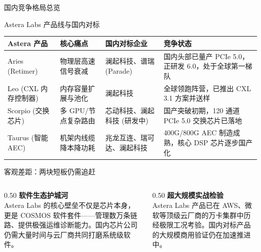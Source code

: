 \documentclass[aspectratio=169, 8pt, UTF8]{ctexbeamer}
\begin{document}
\begin{frame}{国内竞争格局总览}
  \begin{block}{Astera Labs 产品线与国内对标}
    \vspace{2pt}
    \centering
    \footnotesize
    \begin{tabularx}{\textwidth}{p{2.2cm} p{2.4cm} p{3.5cm} p{4.5cm}}
      \toprule
      \textbf{Astera 产品} & \textbf{核心痛点} & \textbf{国内对标企业} & \textbf{竞争状态} \\
      \midrule
      Aries (Retimer)
        & 物理层高速信号衰减
        & 澜起科技、谱瑞 (Parade)
        & 国内头部已量产 PCIe 5.0，正研发 6.0，处于全球第一梯队 \\
      \addlinespace
      Leo (CXL 内存控制器)
        & 内存容量扩展与池化
        & 澜起科技
        & 全球领跑阵营，已推出 CXL 3.1 方案并送样 \\
      \addlinespace
      Scorpio (交换芯片)
        & 多 GPU/节点复杂路由
        & 芯动科技、澜起科技 (研发中)
        & 国产突破初期，120 通道 PCIe 5.0 交换芯片已落地 \\
      \addlinespace
      Taurus (智能 AEC)
        & 机架内线缆降本降功耗
        & 兆龙互连、瑞可达、澜起科技
        & 400G/800G AEC 制造成熟，核心 DSP 芯片逐步国产化 \\
      \bottomrule
    \end{tabularx}
  \end{block}

  \vspace{4pt}

  \begin{alertblock}{客观差距：两块短板仍需追赶}
    \begin{columns}[T]
      \begin{column}{0.50\textwidth}
        \textbf{软件生态护城河}\\[2pt]
        Astera Labs 的核心壁垒不仅是芯片本身，更是 COSMOS 软件套件——管理数万条链路、提供极强运维诊断能力。国内芯片公司仍需大量时间与云厂商共同打磨系统级软件。
      \end{column}
      \begin{column}{0.50\textwidth}
        \textbf{超大规模实战检验}\\[2pt]
        Astera Labs 产品已在 AWS、微软等顶级云厂商的万卡集群中历经极限工况考验。国内对标产品的大规模商用验证仍在加速推进中。
      \end{column}
    \end{columns}
  \end{alertblock}
\end{frame}
\end{document}
